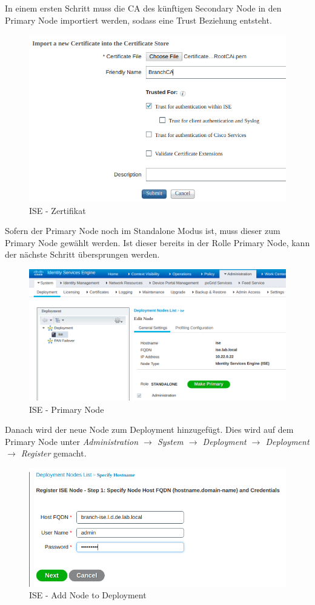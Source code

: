 In einem ersten Schritt muss die CA des künftigen Secondary Node in den Primary Node importiert werden, sodass eine Trust Beziehung entsteht.


\begin{figure}[H]
	\centering
	\includegraphics[width=0.8\linewidth]{img/Absicherung/ISE-Import-Cert.png}
	\caption{ISE - Zertifikat}
	\label{fig:ISE-Zertifikat}
\end{figure}

Sofern der Primary Node noch im Standalone Modus ist, muss dieser zum Primary Node gewählt werden. Ist dieser bereits in der Rolle Primary Node, kann der nächste Schritt übersprungen werden.

\begin{figure}[H]
	\centering
	\includegraphics[width=0.8\linewidth]{img/Absicherung/ISE-Primary-Node.png}
	\caption{ISE - Primary Node}
	\label{fig:ISE - Primary Node}
\end{figure}

Danach wird der neue Node zum Deployment hinzugefügt. Dies wird auf dem Primary Node unter \textit{Administration $\rightarrow$ System $\rightarrow$ Deployment $\rightarrow$ Deployment $\rightarrow$ Register} gemacht.

\begin{figure}[H]
	\centering
	\includegraphics[width=0.8\linewidth]{img/Absicherung/ISE-Add-Node.png}
	\caption{ISE - Add Node to Deployment}
	\label{fig:ISE - Add Node}
\end{figure}

